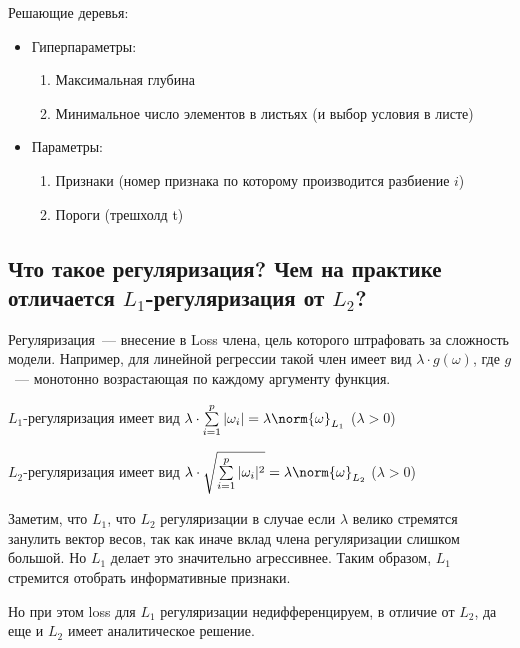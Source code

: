 Решающие деревья:

\begin{itemize}
    \item Гиперпараметры:
    \begin{enumerate}
        \item Максимальная глубина
        \item Минимальное число элементов в листьях (и выбор условия в листе)
    \end{enumerate}
    
    \item Параметры:
    
    \begin{enumerate}
        \item Признаки (номер признака по которому производится разбиение $i$)
        \item Пороги (трешхолд t)
    \end{enumerate}
\end{itemize}











\subsection{Что такое регуляризация? Чем на практике отличается $L_1$-регуляризация от $L_2$?}

\Def Регуляризация~--- внесение в Loss члена, цель которого штрафовать за сложность модели. Например, для линейной регрессии такой член имеет вид $\lambda \cdot g(\omega)$, где $g$~--- монотонно возрастающая по каждому аргументу функция.

\Def $L_1$-регуляризация имеет вид $\lambda \cdot \sum\limits_{i = 1}^p |\omega_i| = \lambda\norm{\omega}_{L_1}$ ($\lambda > 0$)

\Def $L_2$-регуляризация имеет вид $\lambda \cdot \sqrt{\sum\limits_{i = 1}^p |\omega_i|^2} = \lambda\norm{\omega}_{L_2}$ ($\lambda > 0$)

Заметим, что $L_1$, что $L_2$ регуляризации в случае если $\lambda$ велико стремятся занулить вектор весов, так как иначе вклад члена регуляризации слишком большой. Но $L_1$ делает это значительно агрессивнее. Таким образом, $L_1$ стремится отобрать информативные признаки. 

Но при этом loss для $L_1$ регуляризации недифференцируем, в отличие от $L_2$, да еще и $L_2$ имеет аналитическое решение.








